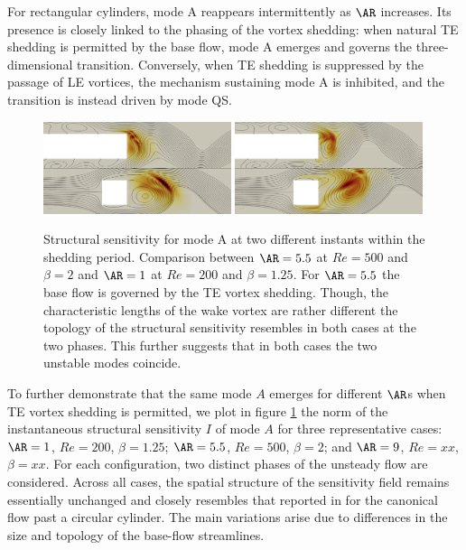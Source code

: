 For rectangular cylinders, mode A reappears intermittently as $\AR$ increases. Its presence is closely linked to the phasing of the vortex shedding: when natural TE shedding is permitted by the base flow, mode A emerges and governs the three-dimensional transition. Conversely, when TE shedding is suppressed by the passage of LE vortices, the mechanism sustaining mode A is inhibited, and the transition is instead driven by mode QS.

\begin{figure}
  \centering
  \includegraphics[width=0.49\textwidth]{./fig/AR5p5/sens_1-200-1p25_5p5-500-2_modeA_75.png}
  \includegraphics[width=0.49\textwidth]{./fig/AR5p5/sens_1-200-1p25_5p5-500-2_modeA_100.png}
  \caption{Structural sensitivity for mode A at two different instants within the shedding period. Comparison between $\AR=5.5$ at $Re=500$ and $\beta=2$ and $\AR=1$ at $Re=200$ and $\beta=1.25$. For $\AR=5.5$ the base flow is governed by the TE vortex shedding. Though, the characteristic lengths of the wake vortex are rather different the topology of the structural sensitivity resembles in both cases at the two phases. This further suggests that in both cases the two unstable modes coincide.}
  \label{fig:sens_modeA}
\end{figure}
%
To further demonstrate that the same mode $A$ emerges for different $\AR$s when TE vortex shedding is permitted, we plot in figure \ref{fig:sens_modeA} the norm of the instantaneous structural sensitivity $I$ of mode $A$ for three representative cases: $\AR=1$, $Re=200$, $\beta=1.25$; $\AR=5.5$, $Re=500$, $\beta=2$; and $\AR=9$, $Re=xx$, $\beta=xx$. For each configuration, two distinct phases of the unsteady flow are considered. Across all cases, the spatial structure of the sensitivity field remains essentially unchanged and closely resembles that reported in \cite{} for the canonical flow past a circular cylinder. The main variations arise due to differences in the size and topology of the base-flow streamlines.
